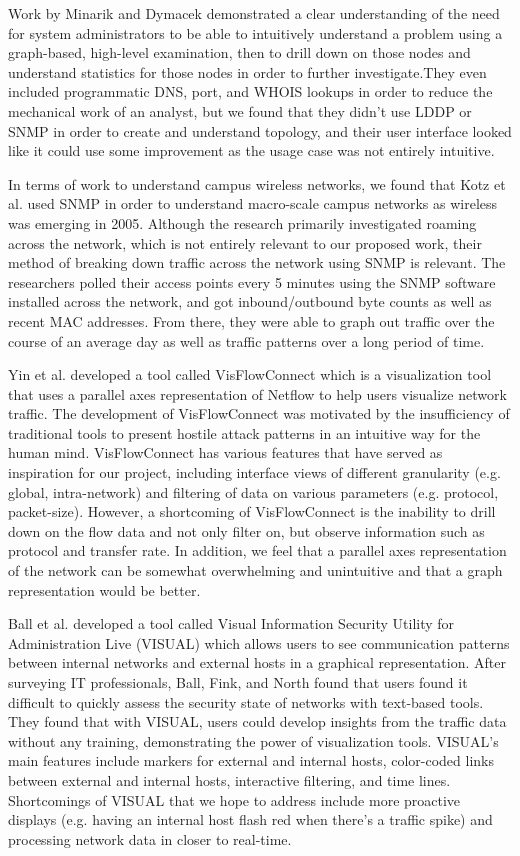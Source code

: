 \documentclass{sig-alternate}
\begin{document}
Work by Minarik and Dymacek\cite{Minarik08} demonstrated a clear understanding
of the need for system administrators to be able to intuitively understand a
problem using a graph-based, high-level examination, then to drill down on those
nodes and understand statistics for those nodes in order to further
investigate.They even included programmatic DNS, port, and WHOIS lookups in
order to reduce the mechanical work of an analyst, but we found that they didn’t
use LDDP or SNMP in order to create and understand topology, and their user
interface looked like it could use some improvement as the usage case was not
entirely intuitive.

In terms of work to understand campus wireless networks, we found that Kotz et
al.\cite{Kotz05} used SNMP in order to understand macro-scale campus networks
as wireless was emerging in 2005. Although the research primarily investigated
roaming across the network, which is not entirely relevant to our proposed work,
their method of breaking down traffic across the network using SNMP is relevant.
The researchers polled their access points every 5 minutes using the SNMP
software installed across the network, and got inbound/outbound byte counts as
well as recent MAC addresses. From there, they were able to graph out traffic
over the course of an average day as well as traffic patterns over a long period
of time.

Yin et al.\cite{Yin04} developed a tool called VisFlowConnect which is a
visualization tool that uses a parallel axes representation of Netflow to help
users visualize network traffic. The development of VisFlowConnect was motivated
by the insufficiency of traditional tools to present hostile attack patterns in
an intuitive way for the human mind.  VisFlowConnect has various features that
have served as inspiration for our project, including interface views of
different granularity (e.g. global, intra-network) and filtering of data on
various parameters (e.g. protocol, packet-size). However, a shortcoming of
VisFlowConnect is the inability to drill down on the flow data and not only
filter on, but observe information such as protocol and transfer rate. In
addition, we feel that a parallel axes representation of the network can be
somewhat overwhelming and unintuitive and that a graph representation would be
better.

Ball et al.\cite{Ball04} developed a tool called Visual Information Security
Utility for Administration Live (VISUAL) which allows users to see communication
patterns between internal networks and external hosts in a graphical
representation.  After surveying IT professionals, Ball, Fink, and North found
that users found it difficult to quickly assess the security state of networks
with text-based tools. They found that with VISUAL, users could develop insights
from the traffic data without any training, demonstrating the power of
visualization tools. VISUAL's main features include markers for external and
internal hosts, color-coded links between external and internal hosts,
interactive filtering, and time lines. Shortcomings of VISUAL that we hope to
address include more proactive displays (e.g. having an internal host flash red
when there's a traffic spike) and processing network data in closer to
real-time.
\end{document}
